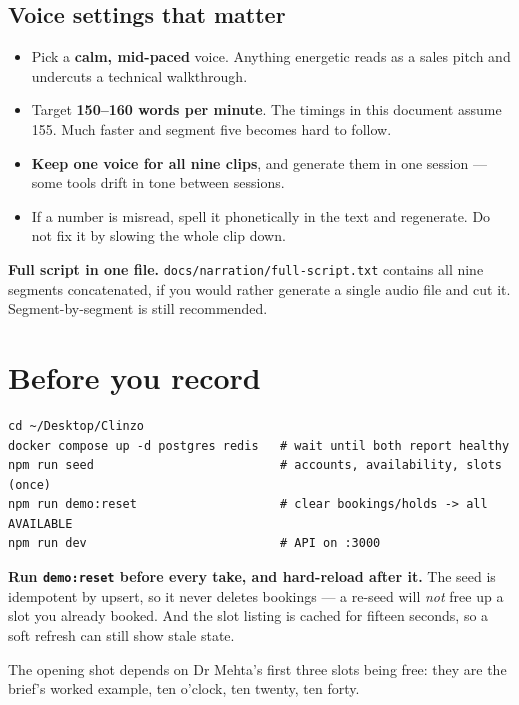 \documentclass[11pt,a4paper]{article}
\begin{document}
\subsection*{Voice settings that matter}

\begin{itemize}[leftmargin=*,itemsep=2pt]
  \item Pick a \textbf{calm, mid-paced} voice. Anything energetic reads as a
        sales pitch and undercuts a technical walkthrough.
  \item Target \textbf{150--160 words per minute}. The timings in this document
        assume 155. Much faster and segment five becomes hard to follow.
  \item \textbf{Keep one voice for all nine clips}, and generate them in one
        session --- some tools drift in tone between sessions.
  \item If a number is misread, spell it phonetically in the text and
        regenerate. Do not fix it by slowing the whole clip down.
\end{itemize}

\begin{note}
\textbf{Full script in one file.} \texttt{docs/narration/full-script.txt}
contains all nine segments concatenated, if you would rather generate a single
audio file and cut it. Segment-by-segment is still recommended.
\end{note}

\section{Before you record}

\begin{lstlisting}
cd ~/Desktop/Clinzo
docker compose up -d postgres redis   # wait until both report healthy
npm run seed                          # accounts, availability, slots (once)
npm run demo:reset                    # clear bookings/holds -> all AVAILABLE
npm run dev                           # API on :3000
\end{lstlisting}

\begin{note}
\textbf{Run \texttt{demo:reset} before every take, and hard-reload after it.}
The seed is idempotent by upsert, so it never deletes bookings --- a re-seed
will \emph{not} free up a slot you already booked. And the slot listing is
cached for fifteen seconds, so a soft refresh can still show stale state.

The opening shot depends on Dr Mehta's first three slots being free: they are
the brief's worked example, ten o'clock, ten twenty, ten forty.
\end{note}
\end{document}
